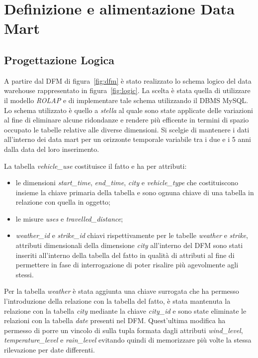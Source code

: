 \chapter{Definizione e alimentazione Data Mart}

\section{Progettazione Logica}

A partire dal DFM di figura~\ref{fig:dfm} è stato realizzato lo schema
logico del data warehouse rappresentato in figura~\ref{fig:logic}.
La scelta è stata quella di utilizzare il modello \textit{ROLAP} e di
implementare tale schema utilizzando il DBMS MySQL.
Lo schema utilizzato è quello a \textit{stella} al quale sono state applicate
delle variazioni al fine di eliminare alcune ridondanze e rendere più efficente
in termini di spazio occupato le tabelle relative alle diverse dimensioni.
Si scelgie di mantenere i dati all'interno dei data mart per un orizzonte
temporale variabile tra i due e i 5 anni dalla data del loro inserimento.

La tabella \textit{vehicle\_use} costituisce il fatto e ha per attributi:
\begin{itemize}
\item le dimensioni \textit{start\_time}, \textit{end\_time}, \textit{city} e
\textit{vehicle\_type} che costituiscono insieme la chiave primaria della
tabella e sono ognuna chiave di una tabella in relazione con quella in oggetto;
\item le misure \textit{uses} e \textit{travelled\_distance};
\item \textit{weather\_id} e \textit{strike\_id} chiavi rispettivamente per
le tabelle \textit{weather} e \textit{strike}, attributi dimensionali della
dimensione \textit{city} all'interno del DFM sono stati inseriti all'interno
della tabella del fatto in qualità di attributi al fine di permettere in
fase di interrogazione di poter risalire più agevolmente agli stessi.
\end{itemize}

Per la tabella \textit{weather} è stata aggiunta una chiave surrogata che ha
permesso l'introduzione della relazione con la tabella del fatto, è stata
mantenuta la relazione con la tabella \textit{city} mediante la chiave
\textit{city\_id} e sono state eliminate le relazioni con la tabella
\textit{date} presenti nel DFM. Quest'ultima modifica ha permesso di
porre un vincolo di  sulla tupla formata dagli attributi
\textit{wind\_level}, \textit{temperature\_level} e \textit{rain\_level}
evitando quindi di memorizzare più volte la stessa rilevazione per date
differenti.

